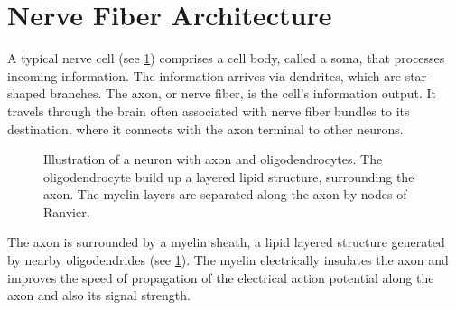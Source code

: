 \section{Nerve Fiber Architecture} \label{sec:fiberArchitecture}
%
A typical nerve cell (see \cref{fig:CortexAndNerveCell}) comprises a cell body, called a soma, that processes incoming information.
The information arrives via dendrites, which are star-shaped branches.
The axon, or nerve fiber, is the cell's information output.
It travels through the brain often associated with nerve fiber bundles to its destination, where it connects with the axon terminal to other neurons.
\par
%
\begin{figure}[!t]
\setlength{\tikzwidth}{0.75\textwidth}
\centering
\tikzset{external/export next=false}
\caption{Illustration of a neuron with axon and oligodendrocytes.
    The oligodendrocyte build up a layered lipid structure, surrounding the axon.
    The myelin layers are separated along the axon by nodes of Ranvier.}
\label{fig:CortexAndNerveCell}
\end{figure}
%
The axon is surrounded by a myelin sheath, a lipid layered structure generated by nearby oligodendrides (see \cref{fig:CortexAndNerveCell}).
The myelin electrically insulates the axon and improves the speed of propagation of the electrical action potential along the axon and also its signal strength.
